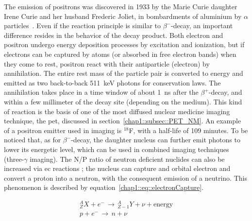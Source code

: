 The emission of positrons was discovered in 1933 by the Marie Curie daughter Irene Curie and her husband Frederic Joliet, in bombardments of aluminium by $\alpha$ particles~\parencite{Leone2010}. Even if the reaction principle is similar to $\beta^-$-decay, an important difference resides in the behavior of the decay product. Both electron and positron undergo energy deposition processes by excitation and ionization, but if electrons can be captured by atoms (or absorbed in free electron bands) when they come to rest, positron react with their antiparticle (electron) by annihilation. The entire rest mass of the particle pair is converted to energy and emitted as two back-to-back 511~keV photons for conservation laws. The annihilation takes place in a time window of about 1~ns after the $\beta^+$-decay, and within a few millimeter of the decay site (depending on the medium). This kind of reaction is the basis of one of the most diffused nuclear medicine imaging technique, the \gls{pet}, discussed in section~\ref{chap1::subsec::PET_NM}. An example of a positron emitter used in imaging is $^{18}$F, with a half-life of 109 minutes.
To be noticed that, as for $\beta^-$-decay, the daughter nucleus can further emit photons to lower its energetic level, which can be used in combined imaging techniques (three-$\gamma$ imaging).
The N/P ratio of neutron deficient nuclides can also be increased via \gls{ec} reactions ; the nucleus can capture and orbital electron and convert a proton into a neutron, with the consequent emission of a neutrino. This phenomenon is described by equation~\ref{chap1::eq::electronCapture}.

 \begin{equation}\label{chap1::eq::electronCapture}
\begin{split}
^{A}_{Z}X + e^{-} \, \rightarrow \, ^{A}_{Z-1}Y  + \nu + \mathrm{energy} \\
p + e^{-}\, \rightarrow \, n  + \nu 
\end{split}
\end{equation}     

